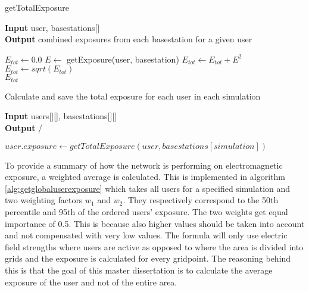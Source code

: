\begin{algorithm}
	\caption{getTotalExposure} 
	\label{alg:gettotalexposure}
     \hspace*{\algorithmicindent} \textbf{Input} user, basestations[]\\
     \hspace*{\algorithmicindent} \textbf{Output} combined exposures from each basestation for a given user
	\begin{algorithmic}[1]
        \State $E_{tot}\gets 0.0$
            \State $E \gets$ getExposure(user, basestation)
            \State $E_{tot}\gets E_{tot} + E^2$	
		\EndFor
        \State $E_{tot}\gets sqrt(E_{tot})$\\
    \Return $E_{tot}$ 
	\end{algorithmic} 
\end{algorithm}

\begin{algorithm}
	\caption{Calculate and save the total exposure for each user in each simulation} 
	\label{alg:main}
     \hspace*{\algorithmicindent} \textbf{Input} users[][], basestations[][]\\
     \hspace*{\algorithmicindent} \textbf{Output} /
	\begin{algorithmic}[1]
				\State $user.exposure \gets  getTotalExposure(user,basestations[simulation])$
			\EndFor
		\EndFor
	\end{algorithmic} 
\end{algorithm}

To provide a summary of how the network is performing on electromagnetic exposure, a weighted average is calculated. This is implemented in algorithm \ref{alg:getglobaluserexposure} which
takes all users for a specified simulation and two weighting factors $w_1$ and $w_2$. They respectively correspond to the 50th percentile and 95th of the ordered users' exposure. The two weights get equal importance of 0.5. This is because also higher values should be taken into account and not compensated with very low values. The formula will only use electric field strengths where users are active as opposed to \cite{J1} where the area is divided into grids and the exposure is calculated for every gridpoint. The reasoning behind this is that the goal of this master dissertation is to calculate the average exposure of the user and not of the entire area.

